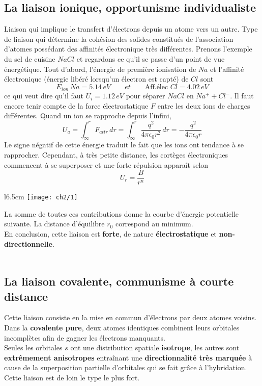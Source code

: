 	\subsection{La liaison ionique, opportunisme individualiste}
		Liaison qui implique le transfert d'électrons depuis un atome vers un autre. Type de liaison qui détermine la cohésion des solides constitués de l'association d'atomes possédant des affinités électronique très différentes. Prenons l'exemple du sel de cuisine $NaCl$ et regardons ce qu'il se passe d'un point de vue énergétique. Tout d'abord, l'énergie de première ionisation de $Na$ et l'affinité électronique (énergie libéré lorsqu'un électron est capté) de $Cl$ sont
		\begin{equation}
			E_{ion}\, Na= 5.14 \, eV \qquad et \qquad \mbox{Aff.élec } Cl = 4.02 \, eV 
		\end{equation}	 
		ce qui veut dire qu'il faut $U_i = 1.12\, eV$ pour séparer $NaCl$ en $Na^++Cl^-$. Il faut encore tenir compte de la force électrostatique $F$ entre les deux ions de charges différentes. Quand un ion se rapproche depuis l'infini, 
		\begin{equation}
			U_a = \int _\infty ^r F_{attr} \, dr= \int _\infty ^r \frac{q^2}{4\pi \epsilon _0 r^2} \, dr = -\frac{q^2}{4\pi \epsilon _0 r}
		\end{equation}
		Le signe négatif de cette énergie traduit le fait que les ions ont tendance à se rapprocher. Cependant, à très petite distance, les cortèges électroniques commencent à se superposer et une forte répulsion apparaît selon 
		\begin{equation}
			U_r = \frac{B}{r^n}
		\end{equation}
		\begin{wrapfigure}[5]{l}{6.5cm}
		\vspace{-14mm}
		\texttt{[image: ch2/1]}
		\end{wrapfigure}
		La somme de toutes ces contributions donne la courbe d'énergie potentielle suivante. La distance d'équilibre $r_0$ correspond au minimum. \\
	En conclusion, cette liaison est \textbf{forte}, de nature \textbf{électrostatique} et \textbf{non-directionnelle}. \\\\

	\subsection{La liaison covalente, communisme à courte distance}
		Cette liaison consiste en la mise en commun d'électrons par deux atomes voisins. Dans la \textbf{covalente pure}, deux atomes identiques combinent leurs orbitales incomplètes afin de gagner les électrons manquants. \\
		Seules les orbitales $s$ ont une distribution spatiale \textbf{isotrope}, les autres sont \textbf{extrêmement anisotropes} entraînant une \textbf{directionnalité très marquée} à cause de la superposition partielle d'orbitales qui se fait grâce à l'hybridation. Cette liaison est de loin le type le plus fort. 
	
